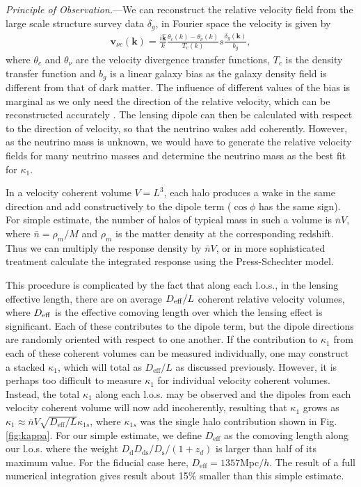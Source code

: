 \documentclass[aps,prl,twocolumn,showpacs,superscriptaddress,groupedaddress,nofootinbib]{revtex4}  %
\newcommand{\mr}{\mathrm}
\begin{document}
{\it Principle of Observation.}---We can reconstruct the relative 
velocity field from the large scale structure 
survey data  $\delta_g$, in Fourier space the velocity is given by
\begin{eqnarray}
  \bm{v}_{\nu c} (\bm{k})= \frac{i\hat{\bm{k}}}{k}\frac{\theta_c(k) -
    \theta_\nu(k)}{T_c(k)}s\frac{\delta_g(\bm{k})}{b_g},
  \label{eqn:flinvel}
\end{eqnarray}
where $\theta_c$ and $\theta_\nu$ are the velocity divergence 
transfer functions, $T_c$ is
the density transfer function and $b_g$ is a linear galaxy bias as 
the galaxy density field is different from that of dark matter. 
The influence of different values of the bias is marginal as we only need
the direction of the relative velocity, which can be reconstructed accurately
\cite{2015PhRvD..92b3502I}.
The lensing dipole can then be calculated with respect to the direction of velocity, so that 
the neutrino wakes add coherently. However, as the neutrino mass is unknown,
we would have to generate the relative velocity fields for many
neutrino masses and determine the neutrino mass as the best fit for
$\kappa_1$. 



In a velocity coherent volume $V=L^3$, 
each halo produces a wake in
the same direction and add constructively to the dipole term
($\cos\phi$ has the same sign).  For simple estimate, the number of
halos of typical mass in such a volume is $\bar{n} V$, where
$\bar{n}=\rho_m/M$ and $\rho_m$ is the matter density at the
corresponding redshift. 
Thus we can multiply the response density by $\bar{n} V$, or
in more sophisticated treatment calculate the integrated response using the 
Press-Schechter model.

This procedure is complicated by the fact that along each l.o.s., in
the lensing effective length, there are on average $D_{\rm eff}/L$
coherent relative velocity volumes, where $D_{\rm eff}$ is the effective
comoving length over which the lensing effect is significant. 
Each of these contributes to the dipole term, but the dipole directions are randomly oriented with
respect to one another. If the contribution to $\kappa_1$ from each of
these coherent volumes can be measured individually, one may construct
a stacked $\kappa_1$, which will total as $D_\mr{eff}/L$ as discussed
previously.  However, it is perhaps too difficult to measure $\kappa_1$
for individual velocity coherent volumes. Instead, the total
$\kappa_1$ along each l.o.s.  may be observed and the dipoles from
each velocity coherent volume will now add incoherently, resulting  
that $\kappa_1$ grows as $\kappa_1\approx \bar{n}V\sqrt{D_\mr{eff}/L} \kappa_{1s}$, where
$\kappa_{1s}$ was the single halo contribution shown in Fig.\ref{fig:kappa}. For our simple estimate,
we define $D_\mr{eff}$ as the comoving length along our l.o.s.  where the weight
$D_\mr{d}D_\mr{ds}/D_\mr{s}/(1+z_d)$ is larger than half of its maximum
value. For the fiducial case here, $D_\mr{eff}=1357$Mpc$/h$. The result of a full
numerical integration gives result about 15\% smaller than this simple estimate.
\end{document}
